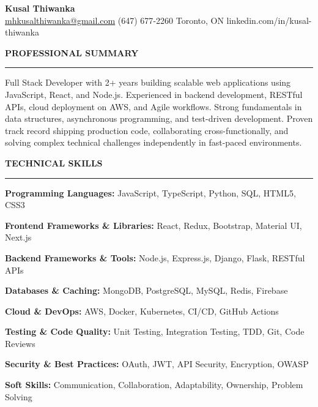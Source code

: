 \documentclass[10pt,letterpaper]{article}
\begin{document}
\begin{center}
{\LARGE\textbf{Kusal Thiwanka}}\\[3pt]
\href{mailto:mhkusalthiwanka@gmail.com}{mhkusalthiwanka@gmail.com}\hspace{2em}%
(647) 677{-}2260\hspace{2em}%
Toronto, ON\hspace{2em}
linkedin.com/in/kusal-thiwanka
\end{center}

\vspace{6pt}

\textbf{PROFESSIONAL SUMMARY}\\[-8pt]
\noindent\rule{\textwidth}{1pt}

\vspace{-2pt}

Full Stack Developer with 2+ years building scalable web applications using JavaScript, React, and Node.js. Experienced in backend development, RESTful APIs, cloud deployment on AWS, and Agile workflows. Strong fundamentals in data structures, asynchronous programming, and test-driven development. Proven track record shipping production code, collaborating cross-functionally, and solving complex technical challenges independently in fast-paced environments.

\vspace{8pt}

\textbf{TECHNICAL SKILLS}\\[-8pt]
\noindent\rule{\textwidth}{1pt}

\vspace{-2pt}

\textbf{Programming Languages:} JavaScript, TypeScript, Python, SQL, HTML5, CSS3

\textbf{Frontend Frameworks \& Libraries:} React, Redux, Bootstrap, Material UI, Next.js

\textbf{Backend Frameworks \& Tools:} Node.js, Express.js, Django, Flask, RESTful APIs

\textbf{Databases \& Caching:} MongoDB, PostgreSQL, MySQL, Redis, Firebase

\textbf{Cloud \& DevOps:} AWS, Docker, Kubernetes, CI/CD, GitHub Actions

\textbf{Testing \& Code Quality:} Unit Testing, Integration Testing, TDD, Git, Code Reviews

\textbf{Security \& Best Practices:} OAuth, JWT, API Security, Encryption, OWASP

\textbf{Soft Skills:} Communication, Collaboration, Adaptability, Ownership, Problem Solving
\end{document}
